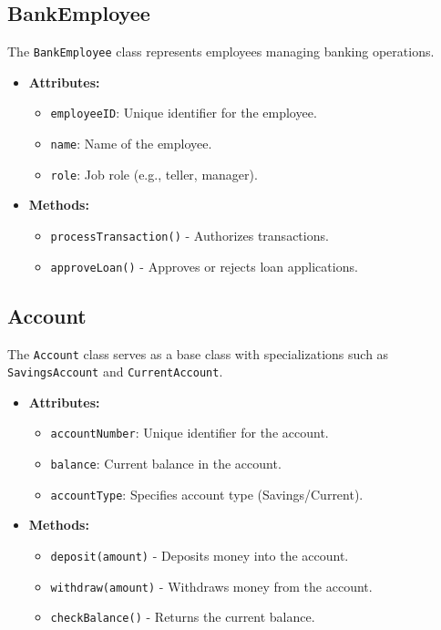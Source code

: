 \subsection{BankEmployee}\label{bankemployee}

The \texttt{BankEmployee} class represents employees managing banking
operations.

\begin{itemize}
\item
  \textbf{Attributes:}

  \begin{itemize}
  \item
    \texttt{employeeID}: Unique identifier for the employee.
  \item
    \texttt{name}: Name of the employee.
  \item
    \texttt{role}: Job role (e.g., teller, manager).
  \end{itemize}
\item
  \textbf{Methods:}

  \begin{itemize}
  \item
    \texttt{processTransaction}\texttt{(}\texttt{)} - Authorizes
    transactions.
  \item
    \texttt{approveLoan}\texttt{(}\texttt{)} - Approves or rejects loan
    applications.
  \end{itemize}
\end{itemize}

\subsection{Account}\label{account}

The \texttt{Account} class serves as a base class with specializations
such as \texttt{SavingsAccount} and \texttt{CurrentAccount}.

\begin{itemize}
\item
  \textbf{Attributes:}

  \begin{itemize}
  \item
    \texttt{accountNumber}: Unique identifier for the account.
  \item
    \texttt{balance}: Current balance in the account.
  \item
    \texttt{accountType}: Specifies account type (Savings/Current).
  \end{itemize}
\item
  \textbf{Methods:}

  \begin{itemize}
  \item
    \texttt{deposit(amount)} - Deposits money into the account.
  \item
    \texttt{withdraw(amount)} - Withdraws money from the account.
  \item
    \texttt{checkBalance}\texttt{(}\texttt{)} - Returns the current
    balance.
  \end{itemize}
\end{itemize}

